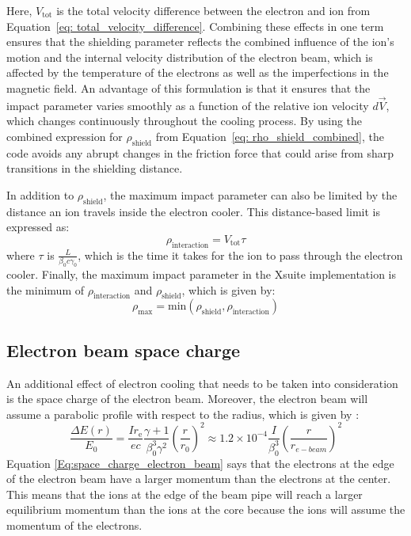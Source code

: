 %
Here, \( V_{\text{tot}} \) is the total velocity difference between the electron and ion from Equation~\ref{eq: total_velocity_difference}. Combining these effects in one term ensures that the shielding parameter reflects the combined influence of the ion’s motion and the internal velocity distribution of the electron beam, which is affected by the temperature of the electrons as well as the imperfections in the magnetic field.
%
An advantage of this formulation is that it ensures that the impact parameter varies smoothly as a function of the relative ion velocity \( d\vec{V} \), which changes continuously throughout the cooling process. By using the combined expression for \( \rho_{\text{shield}} \) from Equation~\eqref{eq: rho_shield_combined}, the code avoids any abrupt changes in the friction force that could arise from sharp transitions in the shielding distance.

In addition to \( \rho_{\text{shield}} \), the maximum impact parameter can also be limited by the distance an ion travels inside the electron cooler. This distance-based limit is expressed as:
%
\begin{equation}
\rho_{\text{interaction}} = V_{\text{tot}} \tau
\end{equation}
%
where \( \tau \) is \( \frac{L}{\beta_0 c \gamma_0} \), which is the time it takes for the ion to pass through the electron cooler.
%
Finally, the maximum impact parameter in the Xsuite implementation is the minimum of \( \rho_{\text{interaction}} \) and \( \rho_{\text{shield}} \), which is given by:
%
\begin{equation}
\rho_\text{max} = \text{min}(\rho_{\text{shield}}, \rho_{\text{interaction}})
\label{eq: max_impact_parameter}
\end{equation}
%
\subsection{Electron beam space charge}

An additional effect of electron cooling that needs to be taken into consideration is the space charge of the electron beam. Moreover, the electron beam will assume a parabolic profile with respect to the radius, which is given by \cite{poth1990electron}:
\begin{equation}
\frac{\Delta E(r)}{E_0}
=\frac{I r_{\mathrm{e}}}{e c} \frac{\gamma+1}{\beta_0^3 \gamma^2}\left(\frac{r}{r_0}\right)^2
\approx 1.2 \times 10^{-4} \frac{I}{\beta_0^3}\left(\frac{r}{r_{e-beam}}\right)^2
\label{Eq:space_charge_electron_beam}
\end{equation}
Equation \ref{Eq:space_charge_electron_beam} says that the electrons at the edge of the electron beam have a larger momentum than the electrons at the center. This means that the ions at the edge of the beam pipe will reach a larger equilibrium momentum than the ions at the core because the ions will assume the momentum of the electrons.

